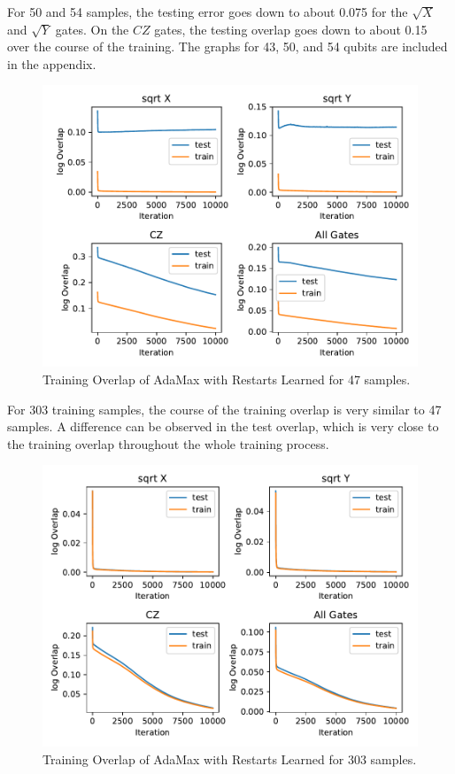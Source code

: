 For 50 and 54 samples, the testing error goes down to about 0.075 for the $\sqrt{X}$ and $\sqrt{Y}$ gates. 
On the $CZ$ gates, the testing overlap goes down to about 0.15 over the course of the training. The graphs 
for 43, 50, and 54 qubits are included in the appendix.

\begin{figure}[H]
  \centering
  \includegraphics[width=\textwidth]{figures/results/AM-restarts-learned/avgOverlap_47.pdf}
  \caption[Training Overlap of AdaMax with Restarts Learned]{Training 
  Overlap of AdaMax with Restarts Learned for 47 samples.}
  \label{fig:am_overlap_47}
\end{figure}

For 303 training samples, the course of the training overlap is very similar to 47 samples.
A difference can be observed in the test overlap, which is very close to the training overlap 
throughout the whole training process.

\begin{figure}[H]
  \centering
  \includegraphics[width=\textwidth]{figures/results/AM-restarts-learned/avgOverlap_303.pdf}
  \caption[Training Overlap of AdaMax with Restarts Learned]{Training 
  Overlap of AdaMax with Restarts Learned for 303 samples.}
  \label{fig:am_overlap_303}
\end{figure}
